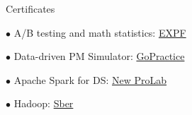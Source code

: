 \documentclass{resume} %
\begin{document}
\begin{rSection}{ Certificates }
    
    \begin{multicols}{2}[]

    $\bullet$ A/B testing and math statistics:
    \href{https://cloud.mail.ru/public/WhV5/7Ua4yoKkW}{EXPF}
    
    $\bullet$ Data-driven PM Simulator: \href{https://gopractice.ru/course/pm/certificate/juqpip7o}{GoPractice}
    
    $\bullet$ Apache Spark for DS: \href{https://cloud.mail.ru/public/SQAS/RrvheyFmY}{New ProLab} 
    
    $\bullet$ Hadoop: \href{https://cloud.mail.ru/public/CH8T/6mMgjbRMZ}{Sber}
    
    \end{multicols}

\end{rSection}
\end{document}
